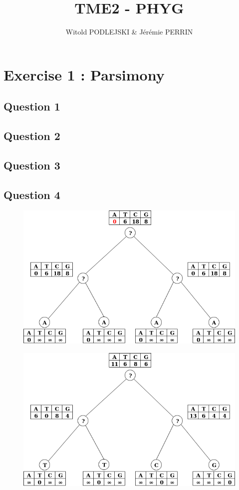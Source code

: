 \documentclass[]{article}
\title{TME2 - PHYG}
\author{Witold PODLEJSKI \& Jérémie PERRIN}
\begin{document}
\maketitle

\section{Exercise 1 : Parsimony}
\subsection{Question 1}
\subsection{Question 2}
\subsection{Question 3}
\subsection{Question 4}
\begin{figure}[h]
	\includegraphics*[width = \linewidth]{image/tree_1.png}
\end{figure}

\begin{figure}[h]
	\includegraphics*[width = \linewidth]{image/tree_2.png}
\end{figure}
\end{document}
